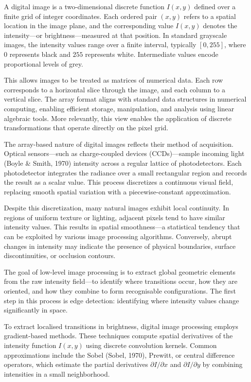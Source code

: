 A digital image is a two-dimensional discrete function $I(x, y)$ defined over a finite grid of integer coordinates. Each ordered pair $(x, y)$ refers to a spatial location in the image plane, and the corresponding value $I(x, y)$ denotes the intensity—or brightness—measured at that position. In standard grayscale images, the intensity values range over a finite interval, typically $[0, 255]$, where $0$ represents black and $255$ represents white. Intermediate values encode proportional levels of grey.

This allows images to be treated as matrices of numerical data. Each row corresponds to a horizontal slice through the image, and each column to a vertical slice. The array format aligns with standard data structures in numerical computing, enabling efficient storage, manipulation, and analysis using linear algebraic tools. More relevantly, this view enables the application of discrete transformations that operate directly on the pixel grid.

The array-based nature of digital images reflects their method of acquisition. Optical sensors—such as charge-coupled devices (CCDs)—sample incoming light (Boyle \& Smith, 1970) intensity across a regular lattice of photodetectors. Each photodetector integrates the radiance over a small rectangular region and records the result as a scalar value. This process discretizes a continuous visual field, replacing smooth spatial variation with a piecewise-constant approximation.

Despite this discretization, many natural images exhibit local continuity. In regions of uniform texture or lighting, adjacent pixels tend to have similar intensity values. This results in spatial smoothness—a statistical tendency that can be exploited by various image processing algorithms. Conversely, abrupt changes in intensity may indicate the presence of physical boundaries, surface discontinuities, or occlusion contours.

The goal of low-level image processing is to extract global geometric elements from the raw intensity field—to identify where transitions occur, how they are oriented, and how they combine to form recognisable configurations. The first step in this process is edge detection: identifying where intensity values change significantly in space.

To extract localised transitions in brightness, digital image processing employs gradient-based methods. These techniques compute spatial derivatives of the intensity function $I(x, y)$ using discrete convolution kernels. Common approximations include the Sobel (Sobel, 1970), Prewitt, or central difference operators, which estimate the partial derivatives $\partial I / \partial x$ and $\partial I / \partial y$ by combining intensities in a small neighborhood.

